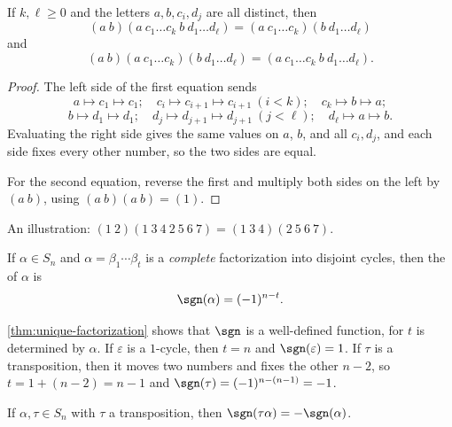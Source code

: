 \begin{lemma}\label{lem:split-merge}
	If \(k, \ell \geq 0\) and the letters \(a, b, c_i, d_j\) are all distinct, then
	\[
		(a\ b)(a\ c_1 \dots c_k\ b\ d_1 \dots d_\ell) = (a\ c_1 \dots c_k)(b\ d_1 \dots d_\ell)
	\]
	and
	\[
		(a\ b)(a\ c_1 \dots c_k)(b\ d_1 \dots d_\ell) = (a\ c_1 \dots c_k\ b\ d_1 \dots d_\ell).
	\]
\end{lemma}

\begin{proof}
	The left side of the first equation sends
	\[
		a \mapsto c_1 \mapsto c_1; \quad
		c_i \mapsto c_{i+1} \mapsto c_{i+1} \ (i < k); \quad
		c_k \mapsto b \mapsto a;
	\]
	\[
		b \mapsto d_1 \mapsto d_1; \quad
		d_j \mapsto d_{j+1} \mapsto d_{j+1} \ (j < \ell); \quad
		d_\ell \mapsto a \mapsto b.
	\]
	Evaluating the right side gives the same values on \(a\), \(b\), and all \(c_i, d_j\),
	and each side fixes every other number, so the two sides are equal.

	For the second equation, reverse the first and multiply both sides on the left by
	\((a\ b)\), using \((a\ b)(a\ b) = (1)\).
\end{proof}

An illustration: \((1\ 2)(1\ 3\ 4\ 2\ 5\ 6\ 7) = (1\ 3\ 4)(2\ 5\ 6\ 7)\).

\begin{definition}[Signum]
	If \(\alpha \in S_n\) and \(\alpha = \beta_1 \cdots \beta_t\) is a \emph{complete}
	factorization into disjoint cycles, then the  of \(\alpha\) is
	\[
		\sgn(\alpha) = (-1)^{n-t}.
	\]
\end{definition}

\autoref{thm:unique-factorization} shows that \(\sgn\) is a well-defined function, for
\(t\) is determined by \(\alpha\). If \(\varepsilon\) is a \(1\)-cycle, then \(t = n\) and
\(\sgn(\varepsilon) = 1\). If \(\tau\) is a transposition, then it moves two numbers and
fixes the other \(n - 2\), so \(t = 1 + (n-2) = n-1\) and
\(\sgn(\tau) = (-1)^{n-(n-1)} = -1\).

\begin{lemma}\label{lem:sgn-transposition}
	If \(\alpha, \tau \in S_n\) with \(\tau\) a transposition, then
	\(\sgn(\tau\alpha) = -\sgn(\alpha)\).
\end{lemma}


